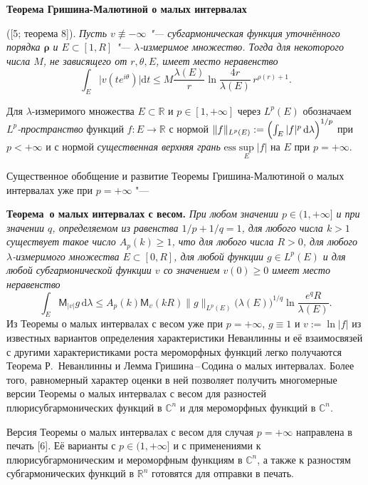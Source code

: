  \noindent
{\bf Теорема Гришина\--Малютиной о малых интервалах} {\rm ([5; теорема 8]). {\it Пусть $v\not\equiv -\infty$ "--- субгармоническая функция уточнённого порядка $\mathbf{\rho}$ и $E\subset [1,R]$ "--- $\lambda$-измеримое множество. Тогда для некоторого числа $M$, не зависящего от $r, \theta, E$, имеет место неравенство
$$
\int_{E} \bigl|v(te^{i\theta})\bigr| \mathrm{d} t\leq
M\frac{\lambda( E)}{r}\ln
\frac{4r}{\lambda( E)}\, r^{\rho(r)+1}.
$$
}

Для $\lambda$-измеримого множества $E\subset \mathbb R$ и $p\in [1,+\infty]$
через $L^p(E)$ обозначаем \textit{$L^p$-пространство\/} функций $f\colon E\to \mathbb R$ с нормой $\|f\|_{L^p(E)}:=\Bigl(\int_E|f|^p\,\mathrm{d}\lambda\Bigr)^{1/p}$ при $p<+\infty$ и с нормой \textit{существенная верхняя грань\/} $\mathrm{ess}\sup\limits_E |f|$ на $E$ при $p=+\infty$.

Существенное обобщение и развитие Теоремы Гришина\--Малютиной о малых интервалах уже при $p=+\infty$ "---

\noindent
\textbf{Теорема~о малых интервалах с весом.} {\it При любом значении $p\in (1,+\infty]$ и при значении $q$, определяемом из равенства $1/p+1/q=1$, для любого числа $k>1$ существует такое число $A_p(k)\geq 1$, что
для любого числа $R> 0$, для любого $\lambda$-измеримого множества $E\subset [0,R]$, для любой функции $g\in L^p(E)$ и для любой субгармонической функции $v$ со значением $v(0)\geq 0$ имеет место неравенство
$$
\int_E\mathsf{M}_{|v|}g\,\mathrm{d} \lambda \leq A_p(k)\mathsf{M}_{v}(kR)
\|g\|_{L^p(E)}\bigl(\lambda(E)\bigr)^{1/q}\ln \frac{e^qR}{\lambda(E)}.
$$
}
Из Теоремы о малых интервалах с весом уже при $p=+\infty$, $g\equiv 1$ и $v:=\ln |f|$ из известных вариантов определения характеристики Неванлинны и её взаимосвязей с другими характеристиками роста мероморфных функций легко получаются Теорема Р.~Неванлинны и Лемма Гришина\,--\,Содина о малых интервалах. Более того, равномерный характер оценки в ней позволяет получить многомерные версии Теоремы о малых интервалах с весом для разностей плюрисубгармонических функций в $\mathbb C^n$ и для мероморфных функций в $\mathbb C^n$.

Версия Теоремы о малых интервалах с весом для случая $p=+\infty$ направлена
в печать [6]. Её варианты с $p\in (1,+\infty]$ и с применениями к плюрисубгармоническим и мероморфным функциям в $\mathbb C^n$, а также
к разностям субгармонических функций в $\mathbb R^n$ готовятся для отправки в печать.

\litlist


}
